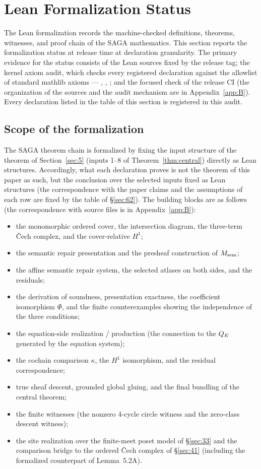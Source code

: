 \section{Lean Formalization Status}\label{sec:6}

The Lean formalization records the machine-checked definitions,
theorems, witnesses, and proof chain of the SAGA mathematics. This
section reports the formalization status at release time at declaration
granularity. The primary evidence for the status consists of the Lean
sources fixed by the release tag; the kernel axiom audit, which checks
every registered declaration against the allowlist of standard mathlib
axioms --- , , ;
and the focused check of the release CI (the organization of the
sources and the audit mechanism are in Appendix~\ref{app:B}). Every
declaration listed in the table of this section is registered in this
audit.

\subsection{Scope of the formalization}\label{sec:61}

The SAGA theorem chain is formalized by fixing the input structure of
the theorem of Section~\ref{sec:5} (inputs 1--8 of
Theorem~\ref{thm:central}) directly as Lean structures. Accordingly,
what each declaration proves is not the theorem of this paper as such,
but the conclusion over the selected inputs fixed as Lean structures
(the correspondence with the paper claims and the assumptions of each
row are fixed by the table of \S\ref{sec:62}). The building blocks are
as follows (the correspondence with source files is in
Appendix~\ref{app:B}):
\begin{itemize}
\item the monomorphic ordered cover, the intersection diagram, the
three-term \v{C}ech complex, and the cover-relative $H^1$;
\item the semantic repair presentation and the presheaf construction
of $M_{\mathrm{sem}}$;
\item the affine semantic repair system, the selected atlases on both
sides, and the residuals;
\item the derivation of soundness, presentation exactness, the
coefficient isomorphism $\Phi$, and the finite counterexamples showing
the independence of the three conditions;
\item the equation-side realization / production (the connection to
the $Q_{E}$ generated by the equation system);
\item the cochain comparison $\kappa$, the $H^1$ isomorphism, and the
residual correspondence;
\item true sheaf descent, grounded global gluing, and the final
bundling of the central theorem;
\item the finite witnesses (the nonzero 4-cycle circle witness and the
zero-class descent witness);
\item the site realization over the finite-meet poset model of
\S\ref{sec:33} and the comparison bridge to the ordered \v{C}ech
complex of \S\ref{sec:41} (including the formalized counterpart of
Lemma~5.2A).
\end{itemize}

